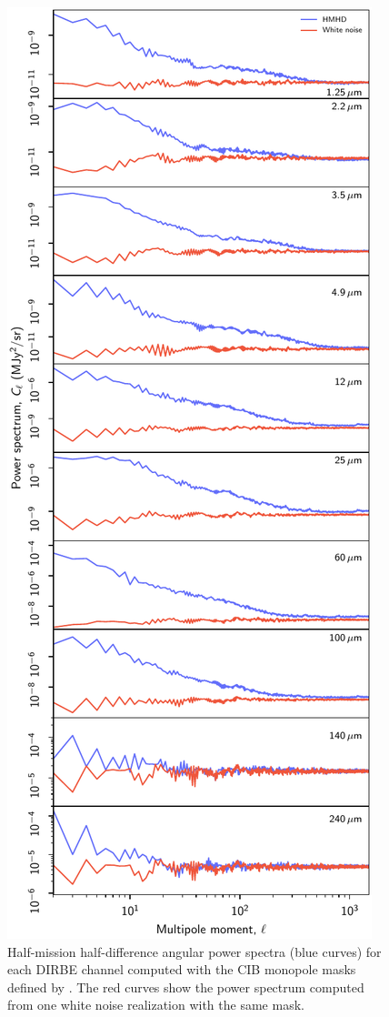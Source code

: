 \documentclass{aa}
\begin{document}
       \begin{figure}
	 \centering
	 \includegraphics[width=\columnwidth]{figs/cls_DR2_hmhd_v2.pdf}
	 \caption{Half-mission half-difference angular power spectra (blue curves) for each DIRBE channel computed with the CIB monopole masks defined by \citet{CG02_03}. The red curves show the power spectrum computed from one white noise realization with the same mask.}
	 \label{fig:hmhd_powspec}
       \end{figure}
\end{document}
